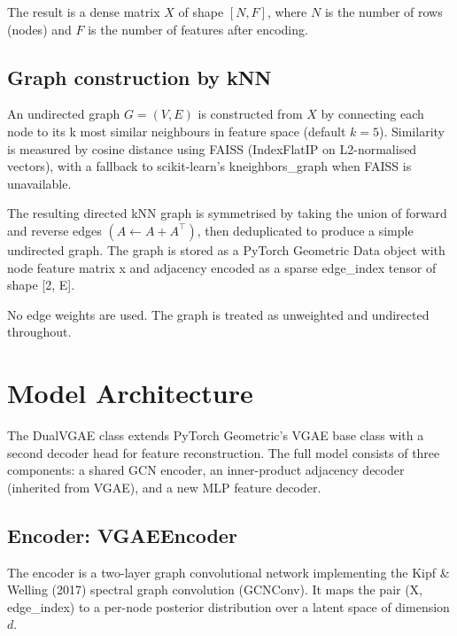 \documentclass[11pt]{article}
\begin{document}
The result is a dense matrix $X$ of shape $[N, F]$, where $N$ is the
number of rows (nodes) and $F$ is the number of features after
encoding.

\subsection{Graph construction by kNN}

An undirected graph $G = (V, E)$ is constructed from $X$ by connecting
each node to its k most similar neighbours in feature space
(default $k = 5$). Similarity is measured by cosine distance using
FAISS (IndexFlatIP on L2-normalised vectors), with a fallback to
scikit-learn's kneighbors\_graph when FAISS is unavailable.
      
The resulting directed kNN graph is symmetrised by taking the union of
forward and reverse edges $(A \gets A + A^\top)$, then deduplicated to produce a
simple undirected graph. The graph is stored as a PyTorch Geometric
Data object with node feature matrix x and adjacency encoded as a
sparse edge\_index tensor of shape [2, E].

No edge weights are used. The graph is treated as unweighted and
undirected throughout.



\section{Model Architecture}

The DualVGAE class extends PyTorch Geometric's VGAE base class with a
second decoder head for feature reconstruction. The full model
consists of three components: a shared GCN encoder, an
inner-product adjacency decoder (inherited from VGAE), and a new
MLP feature decoder.

\subsection{Encoder: VGAEEncoder}
The encoder is a two-layer graph convolutional network implementing
the Kipf \& Welling (2017) spectral graph convolution (GCNConv). It
maps the pair (X, edge\_index) to a per-node posterior distribution
over a latent space of dimension $d$.
\end{document}
